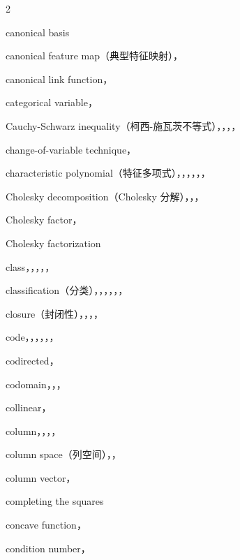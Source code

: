 \begin{multicols}{2}
\medskip{}\par\smallskip
\noindent canonical basis\par
\noindent canonical feature map（典型特征映射），\par
\noindent canonical link function，\par
\noindent categorical variable，\par
\noindent Cauchy-Schwarz inequality（柯西-施瓦茨不等式），，，，\par
\noindent change-of-variable technique，\par
\noindent characteristic polynomial（特征多项式），，，，，，\par
\noindent Cholesky decomposition（Cholesky 分解），，，\par
\noindent Cholesky factor，\par
\noindent Cholesky factorization\par
\noindent class，，，，，\par
\noindent classification（分类），，，，，，\par
\noindent closure（封闭性），，，，\par
\noindent code，，，，，，\par
\noindent codirected，\par
\noindent codomain，，，\par
\noindent collinear，\par
\noindent column，，，，\par
\noindent column space（列空间），，\par
\noindent column vector，\par
\noindent completing the squares\par
\noindent concave function，\par
\noindent condition number，\par

\end{multicols}
